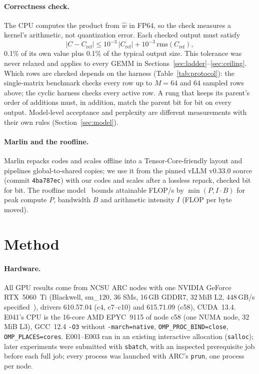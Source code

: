 \documentclass[sigconf,nonacm]{acmart}
\begin{document}
\paragraph{Correctness check.} The CPU computes the product from $\hat w$ in FP64, so the check measures a kernel's arithmetic, not quantization error. Each checked output must satisfy
\[ |C - C_{\mathrm{ref}}| \le 10^{-3}\,|C_{\mathrm{ref}}| + 10^{-3}\,\mathrm{rms}(C_{\mathrm{ref}}), \]
0.1\% of its own value plus 0.1\% of the typical output size. This tolerance was never relaxed and applies to every GEMM in Sections~\ref{sec:ladder}--\ref{sec:ceiling}. Which rows are checked depends on the harness (Table~\ref{tab:protocol}): the single-matrix benchmark checks every row up to $M=64$ and 64 sampled rows above; the cyclic harness checks every active row. A rung that keeps its parent's order of additions must, in addition, match the parent bit for bit on every output. Model-level acceptance and perplexity are different measurements with their own rules (Section~\ref{sec:model}).

\paragraph{Marlin and the roofline.} Marlin repacks codes and scales offline into a Tensor-Core-friendly layout and pipelines global-to-shared copies; we use it from the pinned vLLM v0.33.0 source (commit \texttt{4ba787ec}) with our codes and scales after a lossless repack, checked bit for bit. The roofline model~\cite{roofline} bounds attainable FLOP/s by $\min(P, I \cdot B)$ for peak compute $P$, bandwidth $B$ and arithmetic intensity $I$ (FLOP per byte moved).

\section{Method}
\paragraph{Hardware.} All GPU results come from NCSU ARC nodes with one NVIDIA GeForce RTX~5060~Ti (Blackwell, sm\_120, 36 SMs, 16\,GB GDDR7, 32\,MiB L2, 448\,GB/s specified~\cite{rtx5060ti}), drivers 610.57.04 (c4, c7--c10) and 615.71.09 (c58), CUDA~13.4. E041's CPU is the 16-core AMD EPYC~9115 of node c58 (one NUMA node, 32\,MiB L3), GCC~12.4 \texttt{-O3} without \texttt{-march=native}, \texttt{OMP\_PROC\_BIND=close}, \texttt{OMP\_PLACES=cores}. E001--E003 ran in an existing interactive allocation (\texttt{salloc}); later experiments were submitted with \texttt{sbatch}, with an inspected prerequisite job before each full job; every process was launched with ARC's \texttt{prun}, one process per node.
\end{document}
